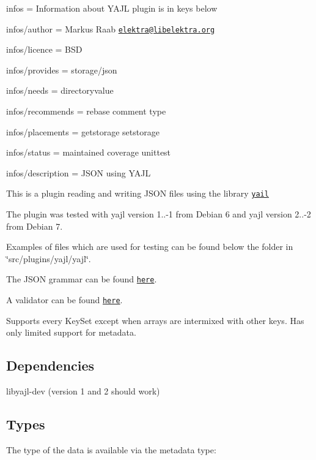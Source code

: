 
\begin{DoxyItemize}
\item infos = Information about Y\+A\+JL plugin is in keys below
\item infos/author = Markus Raab \href{mailto:elektra@libelektra.org}{\tt elektra@libelektra.\+org}
\item infos/licence = B\+SD
\item infos/provides = storage/json
\item infos/needs = directoryvalue
\item infos/recommends = rebase comment type
\item infos/placements = getstorage setstorage
\item infos/status = maintained coverage unittest
\item infos/description = J\+S\+ON using Y\+A\+JL
\end{DoxyItemize}

This is a plugin reading and writing J\+S\+ON files using the library \href{http://lloyd.github.com/yajl/}{\tt yail}

The plugin was tested with yajl version 1..-\/1 from Debian 6 and yajl version 2..-\/2 from Debian 7.

Examples of files which are used for testing can be found below the folder in \char`\"{}src/plugins/yajl/yajl\char`\"{}.

The J\+S\+ON grammar can be found \href{http://www.ietf.org/rfc/rfc4627.txt}{\tt here}.

A validator can be found \href{http://jsonlint.com/}{\tt here}.

Supports every Key\+Set except when arrays are intermixed with other keys. Has only limited support for metadata.

\subsection*{Dependencies}


\begin{DoxyItemize}
\item {\ttfamily libyajl-\/dev} (version 1 and 2 should work)
\end{DoxyItemize}

\subsection*{Types}

The type of the data is available via the metadata {\ttfamily type}\+:


